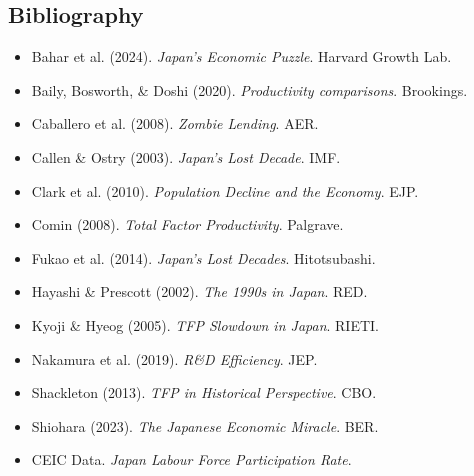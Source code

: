\subsection*{Bibliography}
\begin{itemize}
  \item Bahar et al. (2024). \textit{Japan's Economic Puzzle}. Harvard Growth Lab.
  \item Baily, Bosworth, \& Doshi (2020). \textit{Productivity comparisons}. Brookings.
  \item Caballero et al. (2008). \textit{Zombie Lending}. AER.
  \item Callen \& Ostry (2003). \textit{Japan's Lost Decade}. IMF.
  \item Clark et al. (2010). \textit{Population Decline and the Economy}. EJP.
  \item Comin (2008). \textit{Total Factor Productivity}. Palgrave.
  \item Fukao et al. (2014). \textit{Japan's Lost Decades}. Hitotsubashi.
  \item Hayashi \& Prescott (2002). \textit{The 1990s in Japan}. RED.
  \item Kyoji \& Hyeog (2005). \textit{TFP Slowdown in Japan}. RIETI.
  \item Nakamura et al. (2019). \textit{R\&D Efficiency}. JEP.
  \item Shackleton (2013). \textit{TFP in Historical Perspective}. CBO.
  \item Shiohara (2023). \textit{The Japanese Economic Miracle}. BER.
  \item CEIC Data. \textit{Japan Labour Force Participation Rate}.
\end{itemize}
